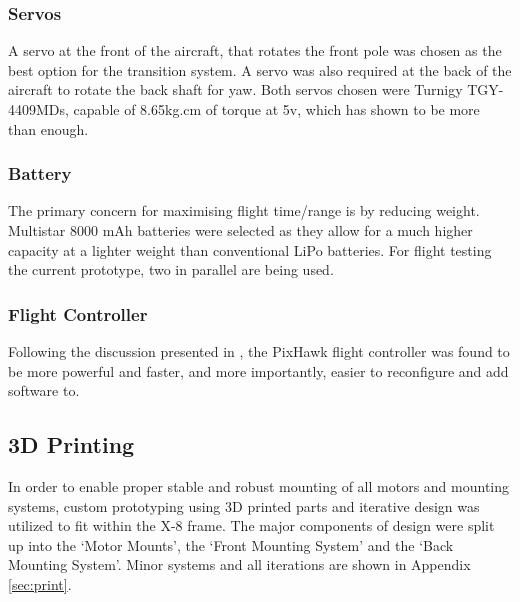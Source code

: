 \subsubsection*{Servos}
A servo at the front of the aircraft, that rotates the front pole was chosen as the best option for the transition system. A servo was also required at the back of the aircraft to rotate the back shaft for yaw. Both servos chosen were Turnigy TGY-4409MDs, capable of 8.65kg.cm of torque at 5v, which has shown to be more than enough. 
		
\subsubsection*{Battery}
The primary concern for maximising flight time/range is by reducing weight. Multistar 8000 mAh batteries were selected as they allow for a much higher capacity at a lighter weight than conventional LiPo batteries. For flight testing the current prototype, two in parallel are being used. 
	
\subsubsection*{Flight Controller}
Following the discussion presented in \cite{ref:controller_comparison}, the PixHawk flight controller was found to be more powerful and faster, and more importantly, easier to reconfigure and add software to.

\subsection{3D Printing}
In order to enable proper stable and robust mounting of all motors and mounting systems, custom prototyping using 3D printed parts and iterative design was utilized to fit within the X-8 frame. The major components of design were split up into the `Motor Mounts', the `Front  Mounting System' and the `Back Mounting System'. Minor systems and all iterations are shown in Appendix \ref{sec:print}.\\

